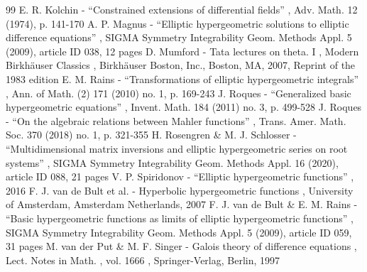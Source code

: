 \documentclass[11pt]{article}
\numberwithin{equation}{section}\providecommand{\loccit}{\textit{loc.\ cit.}}
\theoremstyle{definition}
\begin{document}
\begin{thebibliography}{99}
 E. R. Kolchin - “Constrained extensions of differential fields” , Adv. Math. 12 (1974), p. 141-170
 A. P. Magnus - “Elliptic hypergeometric solutions to elliptic difference equations” , SIGMA Symmetry Integrability Geom. Methods Appl. 5 (2009), article ID 038, 12 pages
 D. Mumford - Tata lectures on theta. I , Modern Birkhäuser Classics , Birkhäuser Boston, Inc., Boston, MA, 2007, Reprint of the 1983 edition
 E. M. Rains - “Transformations of elliptic hypergeometric integrals” , Ann. of Math. (2) 171 (2010) no. 1, p. 169-243
 J. Roques - “Generalized basic hypergeometric equations” , Invent. Math. 184 (2011) no. 3, p. 499-528
 J. Roques - “On the algebraic relations between Mahler functions” , Trans. Amer. Math. Soc. 370 (2018) no. 1, p. 321-355
 H. Rosengren \& M. J. Schlosser - “Multidimensional matrix inversions and elliptic hypergeometric series on root systems” , SIGMA Symmetry Integrability Geom. Methods Appl. 16 (2020), article ID 088, 21 pages
 V. P. Spiridonov - “Elliptic hypergeometric functions” , 2016
 F. J. van de Bult et al. - Hyperbolic hypergeometric functions , University of Amsterdam, Amsterdam Netherlands, 2007
 F. J. van de Bult \& E. M. Rains - “Basic hypergeometric functions as limits of elliptic hypergeometric functions” , SIGMA Symmetry Integrability Geom. Methods Appl. 5 (2009), article ID 059, 31 pages
 M. van der Put \& M. F. Singer - Galois theory of difference equations , Lect. Notes in Math. , vol. 1666 , Springer-Verlag, Berlin, 1997
\end{thebibliography}
\end{document}
